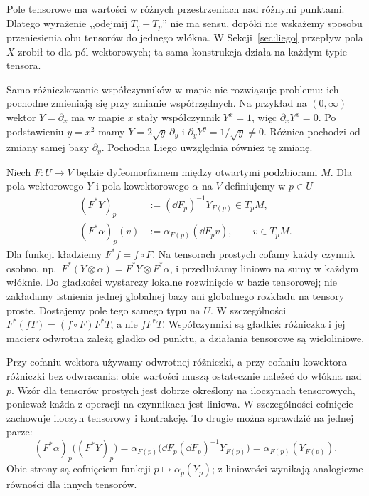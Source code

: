 Pole tensorowe ma wartości w różnych przestrzeniach nad
różnymi punktami. Dlatego wyrażenie ,,odejmij $T_q-T_p$''
nie ma sensu, dopóki nie wskażemy sposobu przeniesienia
obu tensorów do jednego włókna. W Sekcji~\ref{sec:liego}
przepływ pola $X$ zrobił to dla pól wektorowych;
ta sama konstrukcja działa na każdym typie tensora.

Samo różniczkowanie współczynników w mapie nie rozwiązuje
problemu: ich pochodne zmieniają się przy zmianie współrzędnych.
Na przykład na $(0,\infty)$ wektor $Y=\partial_x$ ma w
mapie $x$ stały współczynnik $Y^x=1$, więc
$\partial_xY^x=0$. Po podstawieniu $y=x^2$ mamy
$Y=2\sqrt y\,\partial_y$ i
$\partial_yY^y=1/\sqrt y\ne0$.
Różnica pochodzi od zmiany samej bazy $\partial_y$.
Pochodna Liego uwzględnia również tę zmianę.

\begin{definicja}
\label{def:cofniecie-tensora}
Niech $F\colon U\to V$ będzie dyfeomorfizmem między
otwartymi podzbiorami $M$. Dla pola wektorowego $Y$ i
pola kowektorowego $\alpha$ na $V$ definiujemy w $p\in U$
\begin{align*}
 (F^*Y)_p&:=(\dd F_p)^{-1}Y_{F(p)}\in T_pM,\\
 (F^*\alpha)_p(v)&:=\alpha_{F(p)}(\dd F_pv),
 \qquad v\in T_pM.
\end{align*}
Dla funkcji kładziemy $F^*f=f\circ F$.
Na tensorach prostych cofamy każdy czynnik osobno,
np.\ $F^*(Y\otimes\alpha)=F^*Y\otimes F^*\alpha$,
i przedłużamy liniowo na sumy w każdym włóknie. Do gładkości
wystarczy lokalne rozwinięcie w bazie tensorowej; nie zakładamy
istnienia jednej globalnej bazy ani globalnego rozkładu na tensory proste.
Dostajemy pole
tego samego typu na $U$. W szczególności
$F^*(fT)=(f\circ F)F^*T$, a nie $fF^*T$.
Współczynniki są gładkie: różniczka i jej macierz odwrotna
zależą gładko od punktu, a działania tensorowe są wieloliniowe.
\end{definicja}

Przy cofaniu wektora używamy odwrotnej różniczki,
a przy cofaniu kowektora różniczki bez odwracania:
obie wartości muszą ostatecznie należeć do włókna nad $p$.
Wzór dla tensorów prostych jest dobrze określony na
iloczynach tensorowych, ponieważ każda z operacji na
czynnikach jest liniowa. W szczególności cofnięcie zachowuje
iloczyn tensorowy i kontrakcję. To drugie można sprawdzić
na jednej parze:
\[
 (F^*\alpha)_p\bigl((F^*Y)_p\bigr)
 =\alpha_{F(p)}\bigl(\dd F_p(\dd F_p)^{-1}Y_{F(p)}\bigr)
 =\alpha_{F(p)}(Y_{F(p)}).
\]
Obie strony są cofnięciem funkcji $p\mapsto\alpha_p(Y_p)$;
z liniowości wynikają analogiczne równości dla innych tensorów.

